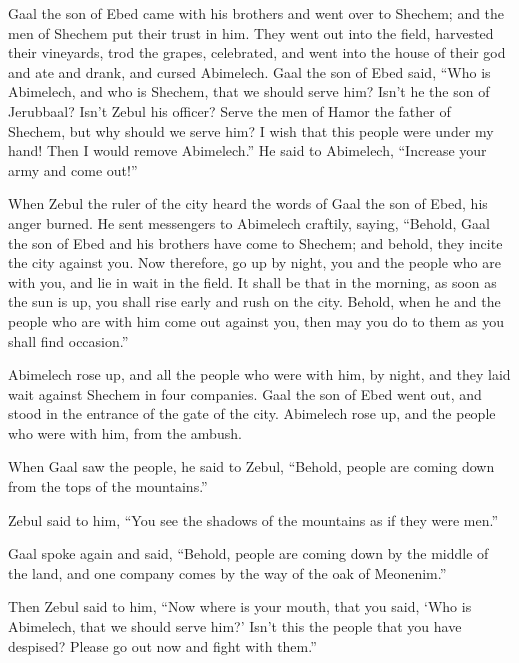  Gaal the son of Ebed came with his brothers and went
over to Shechem; and the men of Shechem put their trust in him.
 They went out into the field, harvested their vineyards,
trod the grapes, celebrated, and went into the house of their god and
ate and drank, and cursed Abimelech.  Gaal the son of
Ebed said, ``Who is Abimelech, and who is Shechem, that we should serve
him? Isn't he the son of Jerubbaal? Isn't Zebul his officer? Serve the
men of Hamor the father of Shechem, but why should we serve him?
 I wish that this people were under my hand! Then I would
remove Abimelech.'' He said to Abimelech, ``Increase your army and come
out!''

 When Zebul the ruler of the city heard the words of Gaal
the son of Ebed, his anger burned.  He sent messengers to
Abimelech craftily, saying, ``Behold, Gaal the son of Ebed and his
brothers have come to Shechem; and behold, they incite the city against
you.  Now therefore, go up by night, you and the people
who are with you, and lie in wait in the field.  It shall
be that in the morning, as soon as the sun is up, you shall rise early
and rush on the city. Behold, when he and the people who are with him
come out against you, then may you do to them as you shall find
occasion.''

 Abimelech rose up, and all the people who were with him,
by night, and they laid wait against Shechem in four companies.
 Gaal the son of Ebed went out, and stood in the entrance
of the gate of the city. Abimelech rose up, and the people who were with
him, from the ambush.

 When Gaal saw the people, he said to Zebul, ``Behold,
people are coming down from the tops of the mountains.''

Zebul said to him, ``You see the shadows of the mountains as if they
were men.''

 Gaal spoke again and said, ``Behold, people are coming
down by the middle of the land, and one company comes by the way of the
oak of Meonenim.''

 Then Zebul said to him, ``Now where is your mouth, that
you said, `Who is Abimelech, that we should serve him?' Isn't this the
people that you have despised? Please go out now and fight with them.''

